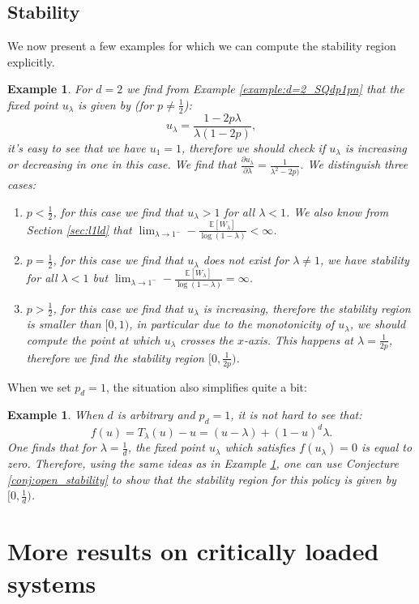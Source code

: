 \documentclass[12pt]{report}
\newcommand{\E}{\mathbb{E}}
\newtheorem{vbd}[theorem]{Example}
\begin{document}
\subsection{Stability}
We now present a few examples for which we can compute the stability region explicitly.
\begin{vbd} \label{vbd:open_stability}
For $d=2$ we find from Example \ref{example:d=2_SQdp1pn} that the fixed point $u_\lambda$ is given by (for $p \neq \frac{1}{2}$):
$$
u_\lambda = \frac{1-2p\lambda}{\lambda(1-2p)},
$$
it's easy to see that we have $u_1 = 1$, therefore we should check if $u_\lambda$ is increasing or decreasing in one in this case. We find that $\frac{\partial u_\lambda}{\partial \lambda} = \frac{1}{\lambda^2 - 2 p)}$. We distinguish three cases:
\begin{enumerate}
\item $p<\frac{1}{2}$, for this case we find that $u_\lambda > 1$ for all $\lambda < 1$. We also know from Section \ref{sec:l1ld} that $\lim_{\lambda \rightarrow 1^-} -\frac{\E[W_\lambda]}{\log(1-\lambda)} < \infty$.
\item $p=\frac{1}{2}$, for this case we find that $u_\lambda$ does not exist for $\lambda \neq 1$, we have stability for all $\lambda < 1$ but $\lim_{\lambda \rightarrow 1^-} -\frac{\E[W_\lambda]}{\log(1-\lambda)} = \infty$.
\item $p>\frac{1}{2}$, for this case we find that $u_\lambda$ is increasing, therefore the stability region is smaller than $[0,1)$, in particular due to the monotonicity of $u_\lambda$, we should compute the point at which $u_\lambda$ crosses the $x$-axis. This happens at $\lambda = \frac{1}{2p}$, therefore we find the stability region $[0,\frac{1}{2p})$.
\end{enumerate}
\end{vbd}
When we set $p_d=1$, the situation also simplifies quite a bit:
\begin{vbd}
When $d$ is arbitrary and $p_d=1$, it is not hard to see that:
$$
f(u)=T_\lambda(u)-u=(u-\lambda)+(1-u)^d \lambda.
$$
One finds that for $\lambda = \frac{1}{d}$, the fixed point $u_\lambda$ which satisfies $f(u_\lambda) = 0$ is equal to zero. Therefore, using the same ideas as in Example \ref{vbd:open_stability}, one can use Conjecture \ref{conj:open_stability} to show that the stability region for this policy is given by $[0,\frac{1}{d})$.
\end{vbd}


\section{More results on critically loaded systems}\label{open:heavy_traffic}
\end{document}
